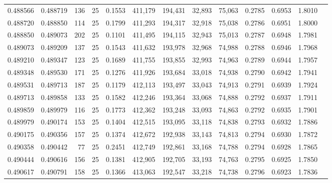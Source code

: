 \begin{tabular}{rrrrrrrrrrrrr}
0.488566 & 0.488719 &   136 &  25 &                                     0.1553 & 411,179 & 194,431 &  32,893 &  75,063 & 0.2785 & 0.6953 & 1.8010 \\
0.488720 & 0.488850 &   114 &  25 &                                     0.1799 & 411,293 & 194,317 &  32,918 &  75,038 & 0.2786 & 0.6951 & 1.8000 \\
0.488850 & 0.489073 &   202 &  25 &                                     0.1101 & 411,495 & 194,115 &  32,943 &  75,013 & 0.2787 & 0.6948 & 1.7981 \\
0.489073 & 0.489209 &   137 &  25 &                                     0.1543 & 411,632 & 193,978 &  32,968 &  74,988 & 0.2788 & 0.6946 & 1.7968 \\
0.489210 & 0.489347 &   123 &  25 &                                     0.1689 & 411,755 & 193,855 &  32,993 &  74,963 & 0.2789 & 0.6944 & 1.7957 \\
0.489348 & 0.489530 &   171 &  25 &                                     0.1276 & 411,926 & 193,684 &  33,018 &  74,938 & 0.2790 & 0.6942 & 1.7941 \\
0.489531 & 0.489713 &   187 &  25 &                                     0.1179 & 412,113 & 193,497 &  33,043 &  74,913 & 0.2791 & 0.6939 & 1.7924 \\
0.489713 & 0.489858 &   133 &  25 &                                     0.1582 & 412,246 & 193,364 &  33,068 &  74,888 & 0.2792 & 0.6937 & 1.7911 \\
0.489859 & 0.489979 &   116 &  25 &                                     0.1773 & 412,362 & 193,248 &  33,093 &  74,863 & 0.2792 & 0.6935 & 1.7901 \\
0.489979 & 0.490174 &   153 &  25 &                                     0.1404 & 412,515 & 193,095 &  33,118 &  74,838 & 0.2793 & 0.6932 & 1.7886 \\
0.490175 & 0.490356 &   157 &  25 &                                     0.1374 & 412,672 & 192,938 &  33,143 &  74,813 & 0.2794 & 0.6930 & 1.7872 \\
0.490358 & 0.490442 &    77 &  25 &                                     0.2451 & 412,749 & 192,861 &  33,168 &  74,788 & 0.2794 & 0.6928 & 1.7865 \\
0.490444 & 0.490616 &   156 &  25 &                                     0.1381 & 412,905 & 192,705 &  33,193 &  74,763 & 0.2795 & 0.6925 & 1.7850 \\
0.490617 & 0.490791 &   158 &  25 &                                     0.1366 & 413,063 & 192,547 &  33,218 &  74,738 & 0.2796 & 0.6923 & 1.7836 \\

\end{tabular}
